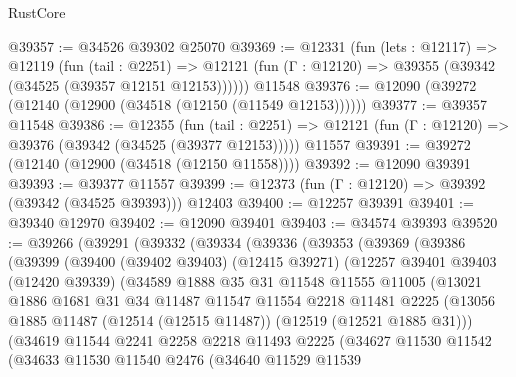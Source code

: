 \begin{lexlean}{RustCore}
\begin{coremodule}
@39357 := @34526 @39302 @25070
@39369 := @12331
    (fun (lets : @12117) =>
    @12119
      (fun (tail : @2251) =>
      @12121 (fun (Γ : @12120) => @39355 (@39342 (@34525 (@39357 @12151 @12153))))))
    @11548
@39376 := @12090 (@39272 (@12140 (@12900 (@34518 (@12150 (@11549 @12153))))))
@39377 := @39357 @11548
@39386 := @12355
    (fun (tail : @2251) => @12121 (fun (Γ : @12120) => @39376 (@39342 (@34525 (@39377 @12153)))))
    @11557
@39391 := @39272 (@12140 (@12900 (@34518 (@12150 @11558))))
@39392 := @12090 @39391
@39393 := @39377 @11557
@39399 := @12373 (fun (Γ : @12120) => @39392 (@39342 (@34525 @39393))) @12403
@39400 := @12257 @39391
@39401 := @39340 @12970
@39402 := @12090 @39401
@39403 := @34574 @39393
@39520 := @39266
    (@39291
      (@39332
        (@39334
          (@39336
            (@39353
              (@39369
                (@39386
                  (@39399
                    (@39400
                      (@39402 @39403)
                      (@12415 @39271)
                      (@12257
                        @39401
                        @39403
                        (@12420 @39339)
                        (@34589
                          @1888
                          @35
                          @31
                          @11548
                          @11555
                          @11005
                          (@13021
                            @1886
                            @1681
                            @31
                            @34
                            @11487
                            @11547
                            @11554
                            @2218
                            @11481
                            @2225
                            (@13056
                              @1885
                              @11487
                              (@12514 (@12515 @11487))
                              (@12519 (@12521 @1885 @31)))
                            (@34619
                              @11544
                              @2241
                              @2258
                              @2218
                              @11493
                              @2225
                              (@34627
                                @11530
                                @11542
                                (@34633
                                  @11530
                                  @11540
                                  @2476
                                  (@34640
                                    @11529
                                    @11539

\end{coremodule}
\end{lexlean}
